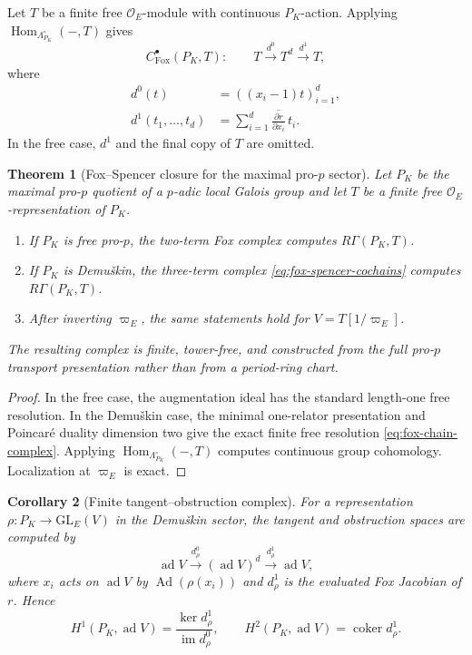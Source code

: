\documentclass[11pt]{article}
\newtheorem{theorem}{Theorem}[section]
\newtheorem{corollary}[theorem]{Corollary}
\theoremstyle{definition}
\newcommand{\ad}{\operatorname{ad}}
\begin{document}
Let $T$ be a finite free $\mathcal O_E$-module with continuous $P_K$-action.  Applying $\operatorname{Hom}_{\Lambda_{P_K}^\circ}(-,T)$ gives
\begin{equation}\label{eq:fox-spencer-cochains}
C_{\mathrm{Fox}}^\bullet(P_K,T):
\qquad
T\xrightarrow{d^0}T^d\xrightarrow{d^1}T,
\end{equation}
where
\begin{align}
 d^0(t)&=((x_i-1)t)_{i=1}^{d},\label{eq:fox-d0}\\
 d^1(t_1,\ldots,t_d)
 &=\sum_{i=1}^{d}
 \overline{\frac{\partial r}{\partial x_i}}\,t_i.
\label{eq:fox-d1}
\end{align}
In the free case, $d^1$ and the final copy of $T$ are omitted.

\begin{theorem}[Fox--Spencer closure for the maximal pro-$p$ sector]\label{thm:fox-spencer-demushkin}
Let $P_K$ be the maximal pro-$p$ quotient of a $p$-adic local Galois group and let $T$ be a finite free $\mathcal O_E$-representation of $P_K$.
\begin{enumerate}
\item If $P_K$ is free pro-$p$, the two-term Fox complex computes $R\Gamma(P_K,T)$.
\item If $P_K$ is Demu\v{s}kin, the three-term complex \eqref{eq:fox-spencer-cochains} computes $R\Gamma(P_K,T)$.
\item After inverting $\varpi_E$, the same statements hold for $V=T[1/\varpi_E]$.
\end{enumerate}
The resulting complex is finite, tower-free, and constructed from the full pro-$p$ transport presentation rather than from a period-ring chart.
\end{theorem}

\begin{proof}
In the free case, the augmentation ideal has the standard length-one free resolution.  In the Demu\v{s}kin case, the minimal one-relator presentation and Poincar\'e duality dimension two give the exact finite free resolution \eqref{eq:fox-chain-complex}.  Applying $\operatorname{Hom}_{\Lambda_{P_K}^\circ}(-,T)$ computes continuous group cohomology.  Localization at $\varpi_E$ is exact.
\end{proof}

\begin{corollary}[Finite tangent--obstruction complex]\label{cor:fox-deformation}
For a representation $\rho:P_K\to\mathrm{GL}_E(V)$ in the Demu\v{s}kin sector, the tangent and obstruction spaces are computed by
\begin{equation}\label{eq:fox-adjoint-complex}
\ad V
\xrightarrow{d^0_\rho}
(\ad V)^d
\xrightarrow{d^1_\rho}
\ad V,
\end{equation}
where $x_i$ acts on $\ad V$ by $\operatorname{Ad}(\rho(x_i))$ and $d^1_\rho$ is the evaluated Fox Jacobian of $r$.  Hence
\[
H^1(P_K,\ad V)=\frac{\ker d^1_\rho}{\operatorname{im}d^0_\rho},
\qquad
H^2(P_K,\ad V)=\operatorname{coker}d^1_\rho.
\]
\end{corollary}
\end{document}
